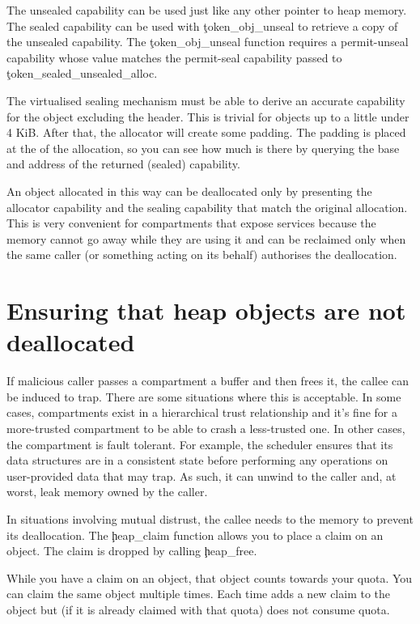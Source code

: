 The unsealed capability can be used just like any other pointer to heap memory.
The sealed capability can be used with \c{token_obj_unseal} to retrieve a copy of the unsealed capability.
The \c{token_obj_unseal} function requires a permit-unseal capability whose value matches the permit-seal capability passed to \c{token_sealed_unsealed_alloc}.

\begin{note}
The virtualised sealing mechanism must be able to derive an accurate capability for the object excluding the header.
This is trivial for objects up to a little under 4 KiB.
After that, the allocator will create some padding.
The padding is placed at the  of the allocation, so you can see how much is there by querying the base and address of the returned (sealed) capability.
\end{note}

An object allocated in this way can be deallocated only by presenting  the allocator capability and the sealing capability that match the original allocation.
This is very convenient for compartments that expose services because the memory cannot go away while they are using it and can be reclaimed only when the same caller (or something acting on its behalf) authorises the deallocation.

\section[label=heap_claim]{Ensuring that heap objects are not deallocated}

If malicious caller passes a compartment a buffer and then frees it, the callee can be induced to trap.
There are some situations where this is acceptable.
In some cases, compartments exist in a hierarchical trust relationship and it's fine for a more-trusted compartment to be able to crash a less-trusted one.
In other cases, the compartment is fault tolerant.
For example, the scheduler ensures that its data structures are in a consistent state before performing any operations on user-provided data that may trap.
As such, it can unwind to the caller and, at worst, leak memory owned by the caller.

In situations involving mutual distrust, the callee needs to  the memory to prevent its deallocation.
The \c{heap_claim} function allows you to place a claim on an object.
The claim is dropped by calling \c{heap_free}.

While you have a claim on an object, that object counts towards your quota.
You can claim the same object multiple times. 
Each time adds a new claim to the object but (if it is already claimed with that quota) does not consume quota.


